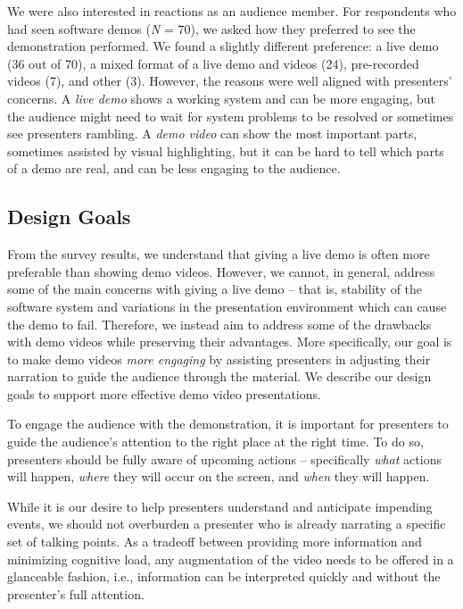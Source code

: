 We were also interested in reactions as an audience member. For respondents who had seen software demos (\textit{N} = 70), we asked how they preferred to see the demonstration performed. We found a slightly different preference: a live demo (36 out of 70), a mixed format of a live demo and videos (24), pre-recorded videos (7), and other (3). However, the reasons were well aligned with presenters' concerns. A\textit{ live demo} shows a working system and can be more engaging, but the audience might need to wait for system problems to be resolved or sometimes see presenters rambling. A\textit{ demo video }can show the most important parts, sometimes assisted by visual highlighting, but it can be hard to tell which parts of a demo are real, and can be less engaging to the audience.

\subsection{Design Goals}
From the survey results, we understand that giving a live demo is often more preferable than showing demo videos. However, we cannot, in general, address some of the main concerns with giving a live demo – that is, stability of the software system and variations in the presentation environment which can cause the demo to fail. Therefore, we instead aim to address some of the drawbacks with demo videos while preserving their advantages. More specifically, our goal is to make demo videos \textit{more engaging} by assisting presenters in adjusting their narration to guide the audience through the material. We describe our design goals to support more effective demo video presentations.

To engage the audience with the demonstration, it is important for presenters to guide the audience's attention to the right place at the right time. To do so, presenters should be fully aware of upcoming actions – specifically \textit{what} actions will happen, \textit{where} they will occur on the screen, and \textit{when} they will happen.

While it is our desire to help presenters understand and anticipate impending events, we should not overburden a presenter who is already narrating a specific set of talking points. As a tradeoff between providing more information and minimizing cognitive load, any augmentation of the video needs to be offered in a glanceable fashion, i.e., information can be interpreted quickly and without the presenter's full attention.

